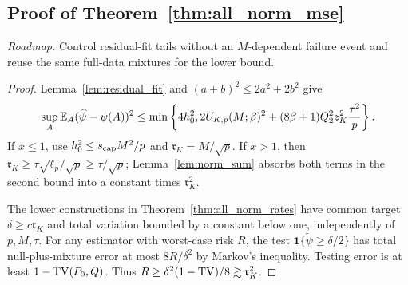 \subsection{Proof of Theorem~\ref{thm:all_norm_mse}}
\noindent\emph{Roadmap.} Control residual-fit tails without an $M$-dependent failure event and reuse the same full-data mixtures for the lower bound.
\begin{proof}
Lemma~\ref{lem:residual_fit} and $(a+b)^2\le2a^2+2b^2$ give
\begin{equation}\label{eq:norm_mse_finite}
 \sup_A\mathbb E_A(\widehat\psi-\psi(A))^2
 \le\min\left\{4h_0^2,
 2U_{K,p}(M;\beta)^2
 +(8\beta+1)Q_2^2z_K^2\frac{\tau^2}{p}\right\}.
\end{equation}
If $x\le1$, use $h_0^2\le s_{\rm cap}M^2/p$ and
$\mathfrak r_K=M/\sqrt p$. If $x>1$, then
$\mathfrak r_K\ge\tau\sqrt{\ell_p}/\sqrt p\ge\tau/\sqrt p$; Lemma~\ref{lem:norm_sum} absorbs both terms in the second bound into a constant times $\mathfrak r_K^2$.

The lower constructions in Theorem~\ref{thm:all_norm_rates} have common target $\delta\ge c\mathfrak r_K$ and total variation bounded by a constant below one, independently of $p,M,\tau$. For any estimator with worst-case risk $R$, the test $\mathbf1\{\widetilde\psi\ge\delta/2\}$ has total null-plus-mixture error at most $8R/\delta^2$ by Markov's inequality. Testing error is at least $1-\operatorname{TV}(P_0,Q)$. Thus
$R\ge\delta^2(1-\operatorname{TV})/8\gtrsim\mathfrak r_K^2$.
\end{proof}

